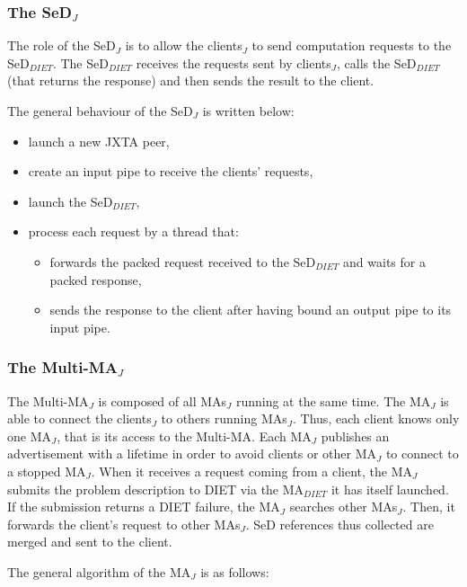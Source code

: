 \subsubsection{The SeD$_{J}$}
\label{sssec:jxtased}

The role of the SeD$_{J}$ is to allow the clients$_{J}$ to send
computation requests to the SeD$_{DIET}$. The SeD$_{DIET}$ receives
the requests sent by clients$_{J}$, calls the SeD$_{DIET}$ (that
returns the response) and then sends the result to the client.

The general behaviour of the SeD$_{J}$ is written below:

\begin{itemize}
  
\item{launch a new JXTA peer,}
\item{create an input pipe to receive the clients' requests,}
\item{launch the SeD$_{DIET}$,}
\item{process each request by a thread that:
\begin{itemize}
\item{forwards the packed request received to the SeD$_{DIET}$ and
    waits for a packed response,}
\item{sends the response to the client after having bound an output
    pipe to its input pipe.}
\end {itemize}}
\end{itemize}

\subsubsection{The Multi-MA$_{J}$}
\label{sssec:jxtamultima}

The Multi-MA$_{J}$ is composed of all MAs$_{J}$ running at the same
time. The MA$_{J}$ is able to connect the clients$_{J}$ to others
running MAs$_{J}$. Thus, each client knows only one MA$_{J}$, that is
its access to the Multi-MA. Each MA$_{J}$ publishes an advertisement
with a lifetime in order to avoid clients or other MA$_{J}$ to connect
to a stopped MA$_{J}$. When it receives a request coming from a
client, the MA$_{J}$ submits the problem description to DIET via the
MA$_{DIET}$ it has itself launched. If the submission returns a DIET
failure, the MA$_{J}$ searches other MAs$_{J}$. Then, it forwards the
client's request to other MAs$_{J}$. SeD references thus collected are
merged and sent to the client.

The general algorithm of the MA$_{J}$ is as follows:

